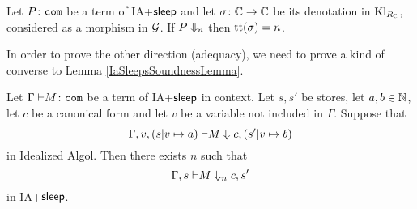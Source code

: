 \documentclass{article}
\begin{document}
\begin{proposition}
  Let $P\colon {\mathtt{com}}$ be a term of IA+${\mathsf{sleep}}$ and let $\sigma\colon \mathbb{C} \to \mathbb{C}$ be its denotation in $\operatorname{Kl}_{R_{\mathbb{C}}}$, considered as a morphism in $\mathcal G$.
  If $P\Downarrow_n$ then $\mathrm{tt}(\sigma)=n$.
  \label{IaSleepSoundness}
\end{proposition}

In order to prove the other direction (adequacy), we need to prove a kind of converse to Lemma \ref{IaSleepsSoundnessLemma}.

\begin{lemma}
  Let $\Gamma{\;\vdash} M\colon {\mathtt{com}}$ be a term of IA+${\mathsf{sleep}}$ in context.
  Let $s,s'$ be stores, let $a,b\in\mathbb{N}$, let $c$ be a canonical form and let $v$ be a variable not included in $\Gamma$.  
  Suppose that
  \[
    \Gamma,v,(s\vert v\mapsto a) {\;\vdash} M \Downarrow c,(s'\vert v\mapsto b)
    \]
  in Idealized Algol.
  Then there exists $n$ such that
  \[
    \Gamma,s {\;\vdash} M \Downarrow_n c,s'
    \]
  in IA+${\mathsf{sleep}}$.
\end{lemma}
\end{document}
